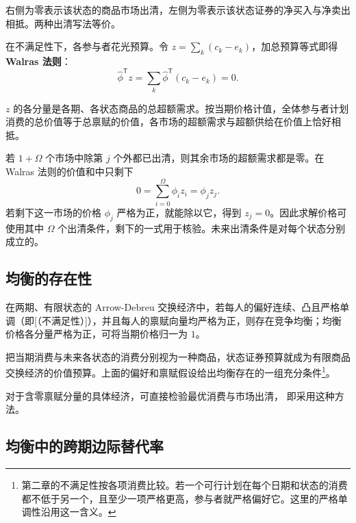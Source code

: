 右侧为零表示该状态的商品市场出清，左侧为零表示该状态证券的净买入与净卖出相抵。两种出清写法等价。

\begin{tcolorbox}[knowledge,title=Walras 法则]
在不满足性下，各参与者花光预算。令 $z=\sum_k(c_k-e_k)$，加总预算等式即得 \textbf{Walras 法则}：
\[
 \hat\phi^{\mathsf T}z=\sum_k\hat\phi^{\mathsf T}(c_k-e_k)=0.
\]

$z$ 的各分量是各期、各状态商品的总超额需求。按当期价格计值，全体参与者计划消费的总价值等于总禀赋的价值，各市场的超额需求与超额供给在价值上恰好相抵。
\end{tcolorbox}

若 $1+\Omega$ 个市场中除第 $j$ 个外都已出清，则其余市场的超额需求都是零。在 Walras 法则的价值和中只剩下
\[
 0=\sum_{i=0}^{\Omega}\phi_i z_i=\phi_j z_j.
\]
若剩下这一市场的价格 $\phi_j$ 严格为正，就能除以它，得到 $z_j=0$。因此求解价格可使用其中 $\Omega$ 个出清条件，剩下的一式用于核验。未来出清条件是对每个状态分别成立的。

\subsection{均衡的存在性}
\begin{tcolorbox}[knowledge]
在两期、有限状态的 Arrow-Debreu 交换经济中，若每人的偏好连续、凸且严格单调（即[（不满足性）]），并且每人的禀赋向量均严格为正，则存在竞争均衡；均衡价格各分量严格为正，可将当期价格归一为 $1$。
\end{tcolorbox}
把当期消费与未来各状态的消费分别视为一种商品，状态证券预算就成为有限商品交换经济的价值预算。上面的偏好和禀赋假设给出均衡存在的一组充分条件\footnote{第二章的不满足性按各项消费比较。若一个可行计划在每个日期和状态的消费都不低于另一个，且至少一项严格更高，参与者就严格偏好它。这里的严格单调性沿用这一含义。}。

对于含零禀赋分量的具体经济，可直接检验最优消费与市场出清， 即采用这种方法。


\subsection{均衡中的跨期边际替代率}
